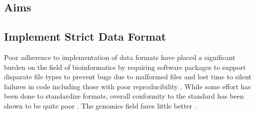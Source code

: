 \documentclass[10pt,letterpaper]{article}
\begin{document}
\begin{multicols}{2}
\section{Aims}



\subsection{Implement Strict Data Format}

Poor adherence to implementation of data formats have placed a
significant burden on the field of bioinformatics by requiring
software packages to support disparate file types to prevent bugs due
to malformed files and lost time to silent failures in code including
those with poor reproducibility
\parencite{natella2018analyzing}. While some effort has been done to
standardize formats, overall conformity to the standard has been shown
to be quite poor \parencites{spidlen2010data, spidlen2021data,
  bray2012fcs, bras2020robust}. The genomics field fares little better
\parencites{greenfield2019importance, gopalacceleration,
  alberti2018introduction, endrullat2016standardization,
  piccolo2021simplifying}.


\end{multicols}
\end{document}
